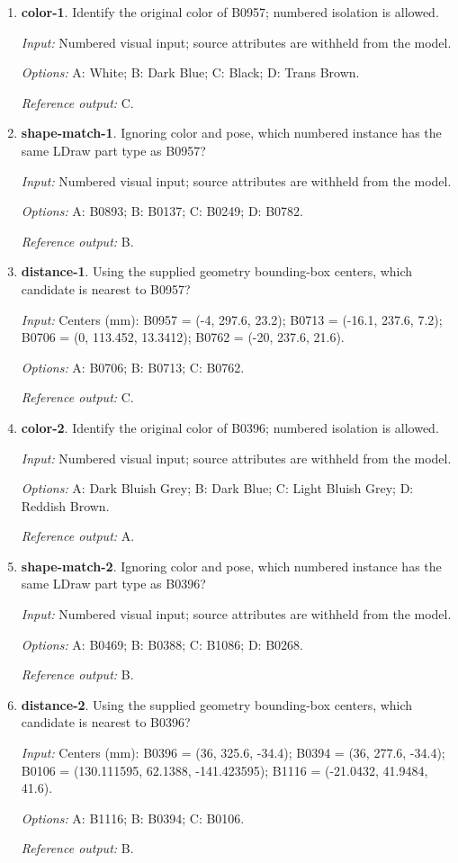 \begin{enumerate}
\item \textbf{color-1}. Identify the original color of B0957; numbered isolation is allowed.\par {\small \textit{Input:} Numbered visual input; source attributes are withheld from the model. \par\textit{Options:} A: White; B: Dark Blue; C: Black; D: Trans Brown. \par\textit{Reference output:} C.}
\item \textbf{shape-match-1}. Ignoring color and pose, which numbered instance has the same LDraw part type as B0957?\par {\small \textit{Input:} Numbered visual input; source attributes are withheld from the model. \par\textit{Options:} A: B0893; B: B0137; C: B0249; D: B0782. \par\textit{Reference output:} B.}
\item \textbf{distance-1}. Using the supplied geometry bounding-box centers, which candidate is nearest to B0957?\par {\small \textit{Input:} Centers (mm): B0957 = (-4, 297.6, 23.2); B0713 = (-16.1, 237.6, 7.2); B0706 = (0, 113.452, 13.3412); B0762 = (-20, 237.6, 21.6). \par\textit{Options:} A: B0706; B: B0713; C: B0762. \par\textit{Reference output:} C.}
\item \textbf{color-2}. Identify the original color of B0396; numbered isolation is allowed.\par {\small \textit{Input:} Numbered visual input; source attributes are withheld from the model. \par\textit{Options:} A: Dark Bluish Grey; B: Dark Blue; C: Light Bluish Grey; D: Reddish Brown. \par\textit{Reference output:} A.}
\item \textbf{shape-match-2}. Ignoring color and pose, which numbered instance has the same LDraw part type as B0396?\par {\small \textit{Input:} Numbered visual input; source attributes are withheld from the model. \par\textit{Options:} A: B0469; B: B0388; C: B1086; D: B0268. \par\textit{Reference output:} B.}
\item \textbf{distance-2}. Using the supplied geometry bounding-box centers, which candidate is nearest to B0396?\par {\small \textit{Input:} Centers (mm): B0396 = (36, 325.6, -34.4); B0394 = (36, 277.6, -34.4); B0106 = (130.111595, 62.1388, -141.423595); B1116 = (-21.0432, 41.9484, 41.6). \par\textit{Options:} A: B1116; B: B0394; C: B0106. \par\textit{Reference output:} B.}

\end{enumerate}
